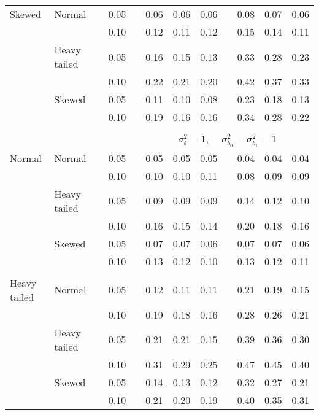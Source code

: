 \begin{table}[ht]
\begin{scriptsize}
\begin{center}
\begin{tabular}{ll p{.1cm} c p{.1cm} rrr p{.1cm} rrr}
Skewed       & Normal       && 0.05 &&  0.06 & 0.06 & 0.06 && 0.08 & 0.07 & 0.06 \\ 
             &              && 0.10 &&  0.12 & 0.11 & 0.12 && 0.15 & 0.14 & 0.11 \\ 
             & Heavy tailed && 0.05 &&  0.16 & 0.15 & 0.13 && 0.33 & 0.28 & 0.23 \\ 
             &              && 0.10 &&  0.22 & 0.21 & 0.20 && 0.42 & 0.37 & 0.33 \\ 
             & Skewed       && 0.05 &&  0.11 & 0.10 & 0.08 && 0.23 & 0.18 & 0.13 \\ 
             &              && 0.10 &&  0.19 & 0.16 & 0.16 && 0.34 & 0.28 & 0.22 \\ 

&&&&&&&&&&&\\
& && && \multicolumn{7}{c}{$\sigma_{\varepsilon}^2 = 1$, \ \ $\sigma_{b_0}^2 = \sigma_{b_1}^2 = 1$} \\ \cline{6-12}
\rowcolor{gray!20}Normal       & Normal       && 0.05 &&  0.05 & 0.05 & 0.05 && 0.04 & 0.04 & 0.04 \\ 
\rowcolor{gray!20}             &              && 0.10 &&  0.10 & 0.10 & 0.11 && 0.08 & 0.09 & 0.09 \\ 
\rowcolor{gray!20}             & Heavy tailed && 0.05 &&  0.09 & 0.09 & 0.09 && 0.14 & 0.12 & 0.10 \\ 
\rowcolor{gray!20}             &              && 0.10 &&  0.16 & 0.15 & 0.14 && 0.20 & 0.18 & 0.16 \\ 
\rowcolor{gray!20}             & Skewed       && 0.05 &&  0.07 & 0.07 & 0.06 && 0.07 & 0.07 & 0.06 \\ 
\rowcolor{gray!20}             &              && 0.10 &&  0.13 & 0.12 & 0.10 && 0.13 & 0.12 & 0.11 \\ 
             &&&&&&&&&&&\\
Heavy tailed & Normal       && 0.05 &&  0.12 & 0.11 & 0.11 && 0.21 & 0.19 & 0.15 \\ 
             &              && 0.10 &&  0.19 & 0.18 & 0.16 && 0.28 & 0.26 & 0.21 \\ 
             & Heavy tailed && 0.05 &&  0.21 & 0.21 & 0.15 && 0.39 & 0.36 & 0.30 \\ 
             &              && 0.10 &&  0.31 & 0.29 & 0.25 && 0.47 & 0.45 & 0.40 \\ 
             & Skewed       && 0.05 &&  0.14 & 0.13 & 0.12 && 0.32 & 0.27 & 0.21 \\ 
             &              && 0.10 &&  0.21 & 0.20 & 0.19 && 0.40 & 0.35 & 0.31 \\ 

\end{tabular}
\end{center}
\end{scriptsize}
\end{table}
